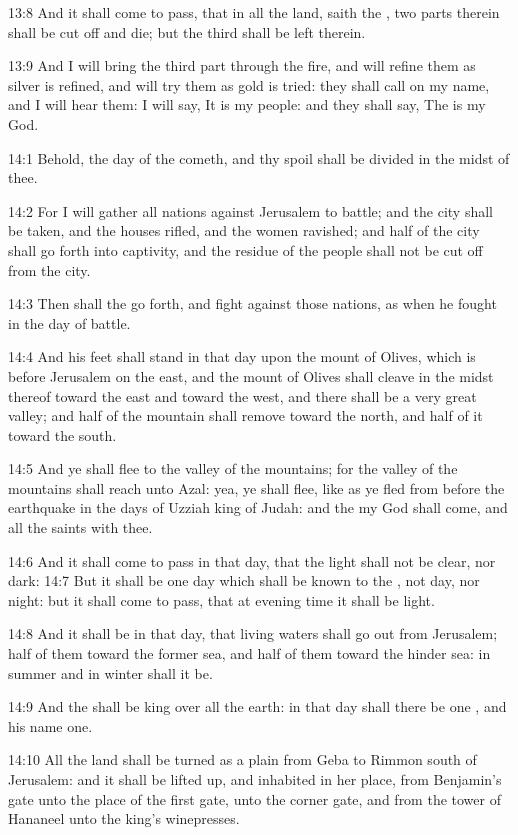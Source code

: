 13:8 And it shall come to pass, that in all the land, saith the \LORD, two parts therein shall be cut off and die; but the third shall be left therein.

13:9 And I will bring the third part through the fire, and will refine them as silver is refined, and will try them as gold is tried: they shall call on my name, and I will hear them: I will say, It is my people: and they shall say, The \LORD is my God.

14:1 Behold, the day of the \LORD cometh, and thy spoil shall be divided in the midst of thee.

14:2 For I will gather all nations against Jerusalem to battle; and the city shall be taken, and the houses rifled, and the women ravished; and half of the city shall go forth into captivity, and the residue of the people shall not be cut off from the city.

14:3 Then shall the \LORD go forth, and fight against those nations, as when he fought in the day of battle.

14:4 And his feet shall stand in that day upon the mount of Olives, which is before Jerusalem on the east, and the mount of Olives shall cleave in the midst thereof toward the east and toward the west, and there shall be a very great valley; and half of the mountain shall remove toward the north, and half of it toward the south.

14:5 And ye shall flee to the valley of the mountains; for the valley of the mountains shall reach unto Azal: yea, ye shall flee, like as ye fled from before the earthquake in the days of Uzziah king of Judah: and the \LORD my God shall come, and all the saints with thee.

14:6 And it shall come to pass in that day, that the light shall not be clear, nor dark: 14:7 But it shall be one day which shall be known to the \LORD, not day, nor night: but it shall come to pass, that at evening time it shall be light.

14:8 And it shall be in that day, that living waters shall go out from Jerusalem; half of them toward the former sea, and half of them toward the hinder sea: in summer and in winter shall it be.

14:9 And the \LORD shall be king over all the earth: in that day shall there be one \LORD, and his name one.

14:10 All the land shall be turned as a plain from Geba to Rimmon south of Jerusalem: and it shall be lifted up, and inhabited in her place, from Benjamin's gate unto the place of the first gate, unto the corner gate, and from the tower of Hananeel unto the king's winepresses.

